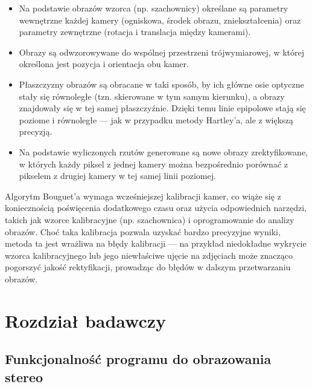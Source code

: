 \documentclass[magisterska]{pracadypl}
\begin{document}
\begin{itemize}
  \item Na podstawie obrazów wzorca (np. szachownicy) określane są parametry wewnętrzne każdej kamery (ogniskowa, środek obrazu, zniekształcenia) oraz parametry zewnętrzne (rotacja i translacja między kamerami).

  \item Obrazy są odwzorowywane do wspólnej przestrzeni trójwymiarowej, w której określona jest pozycja i orientacja obu kamer.


  \item Płaszczyzny obrazów są obracane w taki sposób, by ich główne osie optyczne stały się równoległe (tzn. skierowane w tym samym kierunku), a obrazy znajdowały się w tej samej płaszczyźnie. Dzięki temu linie epipolowe stają się poziome i równoległe — jak w przypadku metody Hartley’a, ale z większą precyzją.


  \item Na podstawie wyliczonych rzutów generowane są nowe obrazy zrektyfikowane, w których każdy piksel z jednej kamery można bezpośrednio porównać z pikselem z drugiej kamery w tej samej linii poziomej.
\end{itemize}

Algorytm Bouguet’a wymaga wcześniejszej kalibracji kamer, co wiąże się z koniecznością poświęcenia dodatkowego czasu oraz użycia odpowiednich narzędzi, takich jak wzorce kalibracyjne (np. szachownica) i oprogramowanie do analizy obrazów. Choć taka kalibracja pozwala uzyskać bardzo precyzyjne wyniki, metoda ta jest wrażliwa na błędy kalibracji — na przykład niedokładne wykrycie wzorca kalibracyjnego lub jego niewłaściwe ujęcie na zdjęciach może znacząco pogorszyć jakość rektyfikacji, prowadząc do błędów w dalszym przetwarzaniu obrazów.

\chapter{Rozdział badawczy}

\section{Funkcjonalność programu do obrazowania stereo}
\end{document}
